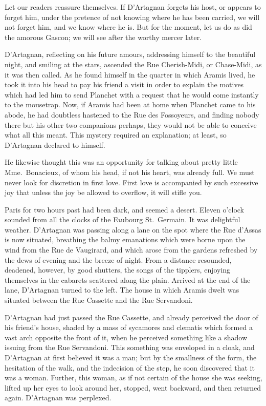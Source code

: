 Let our readers reassure themselves. If D'Artagnan forgets his host, or appears to forget him, under the pretence of not knowing where he has been carried, we will not forget him, and we know where he is. But for the moment, let us do as did the amorous Gascon; we will see after the worthy mercer later. 

D'Artagnan, reflecting on his future amours, addressing himself to the beautiful night, and smiling at the stars, ascended the Rue Cherish-Midi, or Chase-Midi, as it was then called. As he found himself in the quarter in which Aramis lived, he took it into his head to pay his friend a visit in order to explain the motives which had led him to send Planchet with a request that he would come instantly to the mousetrap. Now, if Aramis had been at home when Planchet came to his abode, he had doubtless hastened to the Rue des Fossoyeurs, and finding nobody there but his other two companions perhaps, they would not be able to conceive what all this meant. This mystery required an explanation; at least, so D'Artagnan declared to himself. 

He likewise thought this was an opportunity for talking about pretty little Mme.~Bonacieux, of whom his head, if not his heart, was already full. We must never look for discretion in first love. First love is accompanied by such excessive joy that unless the joy be allowed to overflow, it will stifle you. 

Paris for two hours past had been dark, and seemed a desert. Eleven o'clock sounded from all the clocks of the Faubourg St.~Germain. It was delightful weather. D'Artagnan was passing along a lane on the spot where the Rue d'Assas is now situated, breathing the balmy emanations which were borne upon the wind from the Rue de Vaugirard, and which arose from the gardens refreshed by the dews of evening and the breeze of night. From a distance resounded, deadened, however, by good shutters, the songs of the tipplers, enjoying themselves in the cabarets scattered along the plain. Arrived at the end of the lane, D'Artagnan turned to the left. The house in which Aramis dwelt was situated between the Rue Cassette and the Rue Servandoni. 

D'Artagnan had just passed the Rue Cassette, and already perceived the door of his friend's house, shaded by a mass of sycamores and clematis which formed a vast arch opposite the front of it, when he perceived something like a shadow issuing from the Rue Servandoni. This something was enveloped in a cloak, and D'Artagnan at first believed it was a man; but by the smallness of the form, the hesitation of the walk, and the indecision of the step, he soon discovered that it was a woman. Further, this woman, as if not certain of the house she was seeking, lifted up her eyes to look around her, stopped, went backward, and then returned again. D'Artagnan was perplexed. 

